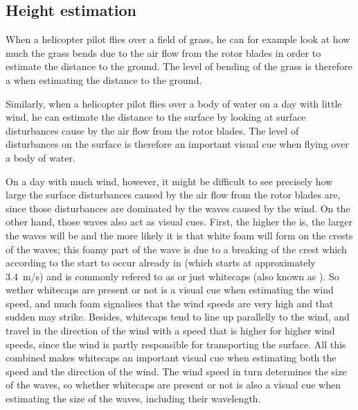 \subsection{Height estimation}

When a helicopter pilot flies over a field of grass, he can for example look at how much the grass bends due to the air flow from the rotor blades in order to estimate the distance to the ground. The level of bending of the grass is therefore a  when estimating the distance to the ground.

Similarly, when a helicopter pilot flies over a body of water on a day with little wind, he can estimate the distance to the surface by looking at surface disturbances cause by the air flow from the rotor blades. The level of disturbances on the surface is therefore an important visual cue when flying over a body of water.


On a day with much wind, however, it might be difficult to see precisely how large the surface disturbances caused by the air flow from the rotor blades are, since those disturbances are dominated by the waves caused by the wind. On the other hand, those waves also act as visual cues. First, the higher the  is, the larger the waves will be and the more likely it is that white foam will form on the crests of the waves; this foamy part of the wave is due to a breaking of the crest which according to the  start to occur already in  (which starts at approximately 3.4~m/s) and is commonly refered to as  or just whitecaps (also known as ). So wether whitecaps are present or not is a visual cue when estimating the wind speed, and much foam signalises that the wind speeds are very high and that sudden \gusts may strike. Besides, whitecaps tend to line up parallelly to the wind, and travel in the direction of the wind with a speed that is higher for higher wind speeds, since the wind is partly responsible for transporting the surface. All this combined makes whitecaps an important visual cue when estimating both the speed and the direction of the wind. The wind speed in turn determines the size of the waves, so whether whitecaps are present or not is also a visual cue when estimating the size of the waves, including their wavelength.

